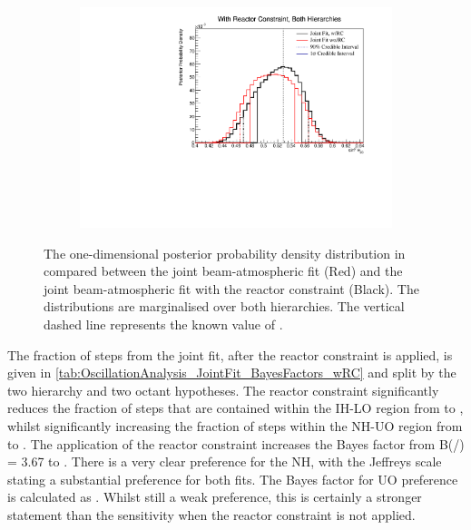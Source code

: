 \begin{figure}[h]
  \begin{subfigure}[t]{0.98\textwidth}
    \includegraphics[width=\textwidth, trim={0mm 0mm 0mm 0mm}, clip,page=1]{Figures/OA/JointFit_wRC_Comp/ContourComparison_1D_th23_BH_2_wRC_woRC_UnSmeared_CredibleInterval.pdf}
  \end{subfigure}
  \caption{The one-dimensional posterior probability density distribution in  compared between the joint beam-atmospheric fit (Red) and the joint beam-atmospheric fit with the reactor constraint (Black). The distributions are marginalised over both hierarchies. The vertical dashed line represents the known value of .}
  \label{fig:OscillationAnalysis_JointFit_wRC_Comp_TH23}
\end{figure}

The fraction of steps from the joint fit, after the reactor constraint is applied, is given in \autoref{tab:OscillationAnalysis_JointFit_BayesFactors_wRC} and split by the two hierarchy and two octant hypotheses. The reactor constraint significantly reduces the fraction of steps that are contained within the IH-LO region from  to , whilst significantly increasing the fraction of steps within the NH-UO region from  to . The application of the reactor constraint increases the Bayes factor from {B(/) = 3.67} to . There is a very clear preference for the NH, with the Jeffreys scale stating a substantial preference for both fits. The Bayes factor for UO preference is calculated as . Whilst still a weak preference, this is certainly a stronger statement than the sensitivity when the reactor constraint is not applied.

